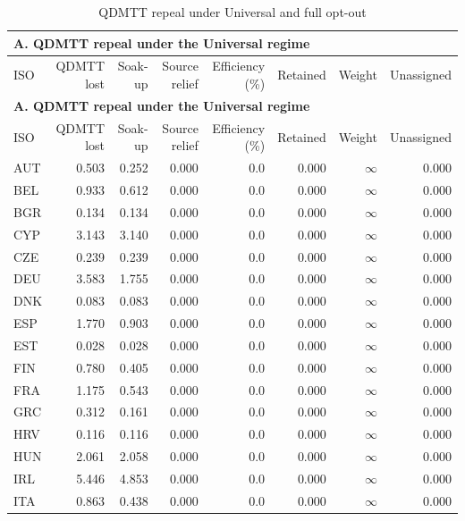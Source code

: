 {\small\setlength{\LTpre}{4pt}\setlength{\LTpost}{4pt}
\begin{longtable}{@{}lrrrrrrr@{}}
\caption{QDMTT repeal under Universal and full opt-out}\label{tab:tab_v2_app_table8_universal_and_optout} \\
\multicolumn{8}{l}{\textbf{A. QDMTT repeal under the Universal regime}} \\
\toprule
ISO & QDMTT lost & Soak-up & Source relief & Efficiency (\%) & Retained & Weight & Unassigned \\
\midrule
\endfirsthead
\multicolumn{8}{l}{\textbf{A. QDMTT repeal under the Universal regime}} \\
\toprule
ISO & QDMTT lost & Soak-up & Source relief & Efficiency (\%) & Retained & Weight & Unassigned \\
\midrule
\endhead
\midrule
\endfoot
\bottomrule
\endlastfoot
AUT & 0.503 & 0.252 & 0.000 &  0.0 & 0.000 & $\infty$ & 0.000 \\
BEL & 0.933 & 0.612 & 0.000 &  0.0 & 0.000 & $\infty$ & 0.000 \\
BGR & 0.134 & 0.134 & 0.000 &  0.0 & 0.000 & $\infty$ & 0.000 \\
CYP & 3.143 & 3.140 & 0.000 &  0.0 & 0.000 & $\infty$ & 0.000 \\
CZE & 0.239 & 0.239 & 0.000 &  0.0 & 0.000 & $\infty$ & 0.000 \\
DEU & 3.583 & 1.755 & 0.000 &  0.0 & 0.000 & $\infty$ & 0.000 \\
DNK & 0.083 & 0.083 & 0.000 &  0.0 & 0.000 & $\infty$ & 0.000 \\
ESP & 1.770 & 0.903 & 0.000 &  0.0 & 0.000 & $\infty$ & 0.000 \\
EST & 0.028 & 0.028 & 0.000 &  0.0 & 0.000 & $\infty$ & 0.000 \\
FIN & 0.780 & 0.405 & 0.000 &  0.0 & 0.000 & $\infty$ & 0.000 \\
FRA & 1.175 & 0.543 & 0.000 &  0.0 & 0.000 & $\infty$ & 0.000 \\
GRC & 0.312 & 0.161 & 0.000 &  0.0 & 0.000 & $\infty$ & 0.000 \\
HRV & 0.116 & 0.116 & 0.000 &  0.0 & 0.000 & $\infty$ & 0.000 \\
HUN & 2.061 & 2.058 & 0.000 &  0.0 & 0.000 & $\infty$ & 0.000 \\
IRL & 5.446 & 4.853 & 0.000 &  0.0 & 0.000 & $\infty$ & 0.000 \\
ITA & 0.863 & 0.438 & 0.000 &  0.0 & 0.000 & $\infty$ & 0.000 \\

\end{longtable}}
